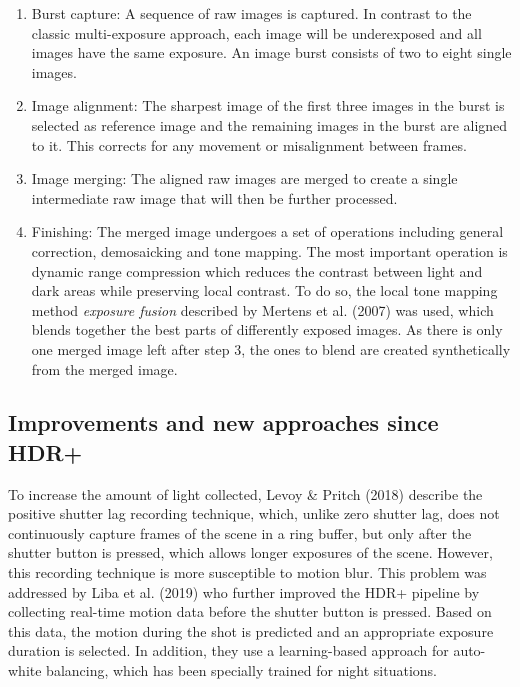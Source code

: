 \documentclass{egpubl}
\begin{document}
\begin{enumerate}
    \item Burst capture: A sequence of raw images is captured. In contrast to the classic 
          multi-exposure approach, each image will be underexposed and all images have the
          same exposure. An image burst consists of two to eight single images.
    \item Image alignment: The sharpest image of the first three images in the burst is 
          selected as reference image and the remaining images in the burst are aligned 
          to it. This corrects for any movement or misalignment between frames.
    \item Image merging: The aligned raw images are merged to create a single intermediate 
          raw image that will then be further processed.
    \item Finishing: The merged image undergoes a set of operations including general
          correction, demosaicking and tone mapping. The most important operation is
          dynamic range compression which reduces the contrast between light and dark
          areas while preserving local contrast. To do so, the local tone mapping method
          \textit{exposure fusion} described by Mertens et al. (2007) \cite{mertens2007exposure} 
          was used, which blends together the best parts of differently exposed images. 
          As there is only one merged image left after step 3, the ones to blend are created synthetically 
          from the merged image.
\end{enumerate}

\subsection{Improvements and new approaches since HDR+}
\label{sec:newerstuff}

To increase the amount of light collected, Levoy {\&} Pritch (2018) \cite{levoy2018psl} describe 
the positive shutter lag recording technique, which, unlike zero shutter lag, does not 
continuously capture frames of the scene in a ring buffer, but only after the shutter button is pressed,
which allows longer exposures of the scene. However, this recording technique is more susceptible to motion blur.
This problem was addressed by Liba et al. (2019) \cite{liba2019handheld} who further improved the HDR+ 
pipeline by collecting real-time motion data before the shutter button is pressed. Based on this data, the motion 
during the shot is predicted and an appropriate exposure duration is selected. In addition, 
they use a learning-based approach for auto-white balancing, which has been specially trained 
for night situations.
\end{document}
